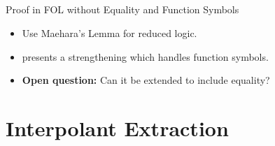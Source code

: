 \documentclass[final,compress]{beamer}
\begin{document}
\subsection{}
\begin{frame}{Proof in FOL without Equality and Function Symbols}


	\begin{itemize}
		\item Use Maehara's Lemma for reduced logic.

		\item \cite{baaz2011methods} presents a strengthening which handles function symbols.

		\item \textbf{Open question:} Can it be extended to include equality?
	\end{itemize}




\end{frame}

\section{Interpolant Extraction} 
\end{document}
